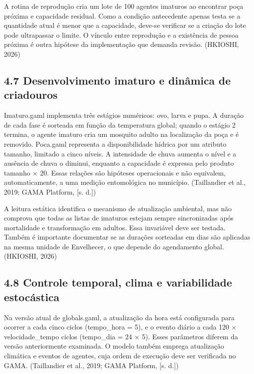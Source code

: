 A rotina de reprodução cria um lote de 100 agentes imaturos ao encontrar
poça próxima e capacidade residual. Como a condição antecedente apenas
testa se a quantidade atual é menor que a capacidade, deve-se verificar
se a criação do lote pode ultrapassar o limite. O vínculo entre
reprodução e a existência de pessoa próxima é outra hipótese da
implementação que demanda revisão. (HKIOSHI, 2026)

\subsection{4.7 Desenvolvimento imaturo e dinâmica de
criadouros}\label{desenvolvimento-imaturo-e-dinuxe2mica-de-criadouros}

Imaturo.gaml implementa três estágios numéricos: ovo, larva e pupa. A
duração de cada fase é sorteada em função da temperatura global; quando
o estágio 2 termina, o agente imaturo cria um mosquito adulto na
localização da poça e é removido. Poca.gaml representa a disponibilidade
hídrica por um atributo tamanho, limitado a cinco níveis. A intensidade
de chuva aumenta o nível e a ausência de chuva o diminui, enquanto a
capacidade é expressa pelo produto tamanho × 20. Essas relações são
hipóteses operacionais e não equivalem, automaticamente, a uma medição
entomológica no município. (Taillandier et al., 2019; GAMA Platform,
{[}s. d.{]})

A leitura estática identifica o mecanismo de atualização ambiental, mas
não comprova que todas as listas de imaturos estejam sempre
sincronizadas após mortalidade e transformação em adultos. Essa
invariável deve ser testada. Também é importante documentar se as
durações sorteadas em dias são aplicadas na mesma unidade de Envelhecer,
o que depende do agendamento global. (HKIOSHI, 2026)

\subsection{4.8 Controle temporal, clima e variabilidade
estocástica}\label{controle-temporal-clima-e-variabilidade-estocuxe1stica}

Na versão atual de globals.gaml, a atualização da hora está configurada
para ocorrer a cada cinco ciclos (tempo\_hora = 5), e o evento diário a
cada 120 × velocidade\_tempo ciclos (tempo\_dia = 24 × 5). Esses
parâmetros diferem da versão anteriormente examinada. O modelo também
emprega atualização climática e eventos de agentes, cuja ordem de
execução deve ser verificada no GAMA. (Taillandier et al., 2019; GAMA
Platform, {[}s. d.{]})

